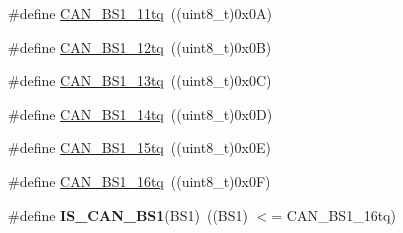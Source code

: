 \begin{DoxyCompactItemize}
\#define \hyperlink{group__CAN__time__quantum__in__bit__segment__1_ga4f765ffbe7fda4fb6d0fde7bc4058a14}{CAN\_\-BS1\_\-11tq}~((uint8\_\-t)0x0A)
\item 
\#define \hyperlink{group__CAN__time__quantum__in__bit__segment__1_ga14c4e928f615babc14c6a9e80ee86a6c}{CAN\_\-BS1\_\-12tq}~((uint8\_\-t)0x0B)
\item 
\#define \hyperlink{group__CAN__time__quantum__in__bit__segment__1_ga2087caec94be44837c1e6965da7f6236}{CAN\_\-BS1\_\-13tq}~((uint8\_\-t)0x0C)
\item 
\#define \hyperlink{group__CAN__time__quantum__in__bit__segment__1_gac0c71e1020a4fbaf66bce754bd54d8cb}{CAN\_\-BS1\_\-14tq}~((uint8\_\-t)0x0D)
\item 
\#define \hyperlink{group__CAN__time__quantum__in__bit__segment__1_gaa52c8674dc7caae1089e5276cd13db5f}{CAN\_\-BS1\_\-15tq}~((uint8\_\-t)0x0E)
\item 
\#define \hyperlink{group__CAN__time__quantum__in__bit__segment__1_ga3be52c699f5618cc318c143ee42f5966}{CAN\_\-BS1\_\-16tq}~((uint8\_\-t)0x0F)
\item 
\hypertarget{group__CAN__time__quantum__in__bit__segment__1_ga225f1457e1c6b8fc3b5af0f463933152}{
\#define {\bfseries IS\_\-CAN\_\-BS1}(BS1)~((BS1) $<$= CAN\_\-BS1\_\-16tq)}
\label{group__CAN__time__quantum__in__bit__segment__1_ga225f1457e1c6b8fc3b5af0f463933152}

\end{DoxyCompactItemize}


